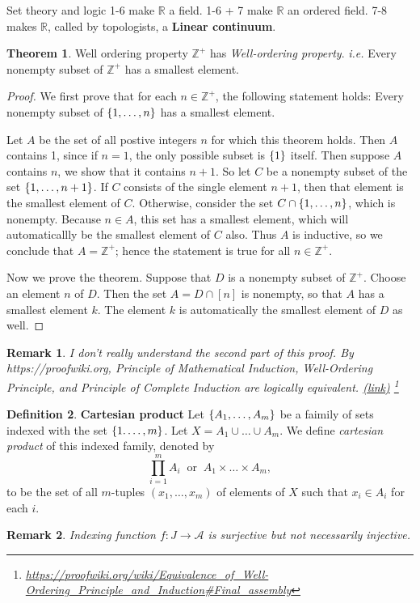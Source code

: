 \documentclass{report}
\newcommand*{\link}[1]{\href{#1}{(\underline{link})}%
  \footnote{\url{#1}}}
\newtheorem*{remark}{Remark}
\theoremstyle{definition}
\newtheorem{theorem}{Theorem}[chapter]
\newtheorem{definition}[theorem]{Definition}
\newcommand{\defn}[1]{\textbf{#1}\label{#1}\index{#1}}
\newcommand{\set}[1]{\ensuremath\left\{#1\right\}}
\newcommand{\ie}{\textit{i.e.}\xspace}
\newcommand{\ZZ}{\mathbb{Z}}
\newcommand{\RR}{\mathbb{R}}
\begin{document}
\begin{chapter}{Set theory and logic}
  1-6 make $\RR$ a field. 1-6 + 7 make $\RR$ an ordered field. 7-8
  makes $\RR$, called by topologists, a \defn{Linear continuum}.

  \begin{theorem}{Well ordering property}
    $\ZZ^+$ has \emph{Well-ordering property}. \ie Every nonempty
    subset of $\ZZ^+$ has a smallest element.
  \end{theorem}
  \begin{proof}
    We first prove that for each $n\in\ZZ^+$, the following statement
    holds: Every nonempty subset of $\set{1,\ldots,n}$ has a smallest
    element.

    Let $A$ be the set of all postive integers $n$ for which this
    theorem holds. Then $A$ contains 1, since if $n=1$, the only
    possible subset is $\set{1}$ itself. Then suppose $A$ contains $n$,
    we show that it contains $n+1$. So let $C$ be a nonempty subset of
    the set $\set{1,\ldots,n+1}$. If $C$ consists of the single
    element $n+1$, then that element is the smallest element of
    $C$. Otherwise, consider the set $C\cap\set{1,\ldots,n}$, which is
    nonempty. Because $n\in A$, this set has a smallest element, which
    will automaticallly be the smallest element of $C$ also. Thus $A$
    is inductive, so we conclude that $A=\ZZ^+$; hence the statement
    is true for all $n\in\ZZ^+$.

    Now we prove the theorem. Suppose that $D$ is a nonempty subset of
    $\ZZ^+$. Choose an element $n$ of $D$. Then the set $A=D\cap[n]$
    is nonempty, so that $A$ has a smallest element $k$. The element
    $k$ is automatically the smallest element of $D$ as well.
  \end{proof}
  \begin{remark}
    I don't really understand the second part of this proof. By
    {\textup{https://proofwiki.org}}, Principle of Mathematical
    Induction, Well-Ordering Principle, and Principle of Complete
    Induction are logically equivalent.
    \link{https://proofwiki.org/wiki/Equivalence_of_Well-Ordering_Principle_and_Induction\#Final_assembly}
  \end{remark}

  \begin{definition}{\defn{Cartesian product}}
    Let $\set{A_1,\ldots,A_m}$ be a faimily of sets indexed with the
    set $\set{1.\ldots,m}$. Let $X=A_1\cup\dots\cup A_m$. We define
    \emph{cartesian product} of this indexed family, denoted by
    $$\prod_{i=1}^mA_i\;\;\text{or}\;\;A_1\times \dots \times A_m,$$
    to be the set of all $m$-tuples $(x_1,\ldots,x_m)$ of elements of
    $X$ such that $x_i\in A_i$ for each $i$.
  \end{definition}
  \begin{remark}
    Indexing function $f:J\to\mathcal{A}$ is surjective but not
    necessarily injective.
  \end{remark}


\end{chapter}
\end{document}
